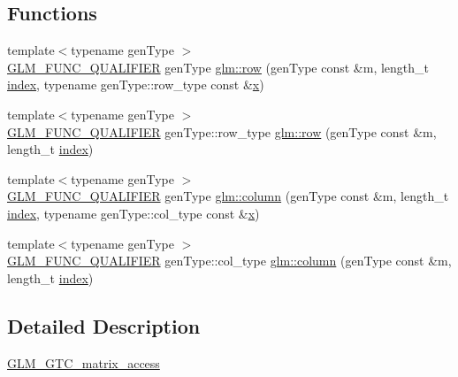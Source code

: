 \subsection*{Functions}
\begin{DoxyCompactItemize}
\item 
{\footnotesize template$<$typename gen\+Type $>$ }\\\mbox{\hyperlink{setup_8hpp_a33fdea6f91c5f834105f7415e2a64407}{G\+L\+M\+\_\+\+F\+U\+N\+C\+\_\+\+Q\+U\+A\+L\+I\+F\+I\+ER}} gen\+Type \mbox{\hyperlink{group__gtc__matrix__access_gaadcc64829aadf4103477679e48c7594f}{glm\+::row}} (gen\+Type const \&m, length\+\_\+t \mbox{\hyperlink{glad_8h_a6468fe3bfff24d7d939eb21863b88268}{index}}, typename gen\+Type\+::row\+\_\+type const \&\mbox{\hyperlink{glad_8h_a92d0386e5c19fb81ea88c9f99644ab1d}{x}})
\item 
{\footnotesize template$<$typename gen\+Type $>$ }\\\mbox{\hyperlink{setup_8hpp_a33fdea6f91c5f834105f7415e2a64407}{G\+L\+M\+\_\+\+F\+U\+N\+C\+\_\+\+Q\+U\+A\+L\+I\+F\+I\+ER}} gen\+Type\+::row\+\_\+type \mbox{\hyperlink{group__gtc__matrix__access_ga259e5ebd0f31ec3f83440f8cae7f5dba}{glm\+::row}} (gen\+Type const \&m, length\+\_\+t \mbox{\hyperlink{glad_8h_a6468fe3bfff24d7d939eb21863b88268}{index}})
\item 
{\footnotesize template$<$typename gen\+Type $>$ }\\\mbox{\hyperlink{setup_8hpp_a33fdea6f91c5f834105f7415e2a64407}{G\+L\+M\+\_\+\+F\+U\+N\+C\+\_\+\+Q\+U\+A\+L\+I\+F\+I\+ER}} gen\+Type \mbox{\hyperlink{group__gtc__matrix__access_ga9e757377523890e8b80c5843dbe4dd15}{glm\+::column}} (gen\+Type const \&m, length\+\_\+t \mbox{\hyperlink{glad_8h_a6468fe3bfff24d7d939eb21863b88268}{index}}, typename gen\+Type\+::col\+\_\+type const \&\mbox{\hyperlink{glad_8h_a92d0386e5c19fb81ea88c9f99644ab1d}{x}})
\item 
{\footnotesize template$<$typename gen\+Type $>$ }\\\mbox{\hyperlink{setup_8hpp_a33fdea6f91c5f834105f7415e2a64407}{G\+L\+M\+\_\+\+F\+U\+N\+C\+\_\+\+Q\+U\+A\+L\+I\+F\+I\+ER}} gen\+Type\+::col\+\_\+type \mbox{\hyperlink{group__gtc__matrix__access_ga96022eb0d3fae39d89fc7a954e59b374}{glm\+::column}} (gen\+Type const \&m, length\+\_\+t \mbox{\hyperlink{glad_8h_a6468fe3bfff24d7d939eb21863b88268}{index}})
\end{DoxyCompactItemize}


\subsection{Detailed Description}
\mbox{\hyperlink{group__gtc__matrix__access}{G\+L\+M\+\_\+\+G\+T\+C\+\_\+matrix\+\_\+access}} 